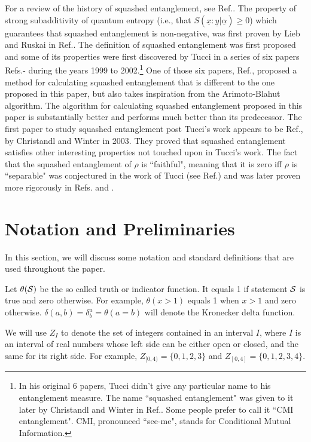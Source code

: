 \documentclass[12pt]{article}%
\newcommand{\ul}[1]{\underline{#1}}
\newcommand{\rvx}[0]{{\ul{x}}}
\newcommand{\rvy}[0]{{\ul{y}}}
\newcommand{\cals}[0]{{\cal S}}
\newcommand{\rvalp}[0]{{\ul{\alpha}}}
\begin{document}
For a review of the history of squashed
entanglement, see Ref.\cite{sq-wiki}.
The property
of strong subadditivity
of quantum entropy (i.e., that
$S(\rvx:\rvy|\rvalp)\geq 0$)
which guarantees that
squashed entanglement is non-negative, was first proven by Lieb and Ruskai in Ref.\cite{subadd-proof}.
The definition of squashed entanglement was first
proposed
and some of its properties
were first discovered by Tucci in a series of six papers
Refs.\cite{Tuc99}-\cite{Tuc02}
during the years 1999 to 2002.\footnote{
In his original 6 papers, Tucci didn't give any particular name to
his entanglement measure. The
name ``squashed  entanglement" was given
to it later by Christandl and Winter in Ref.\cite{Chr03}.
Some people prefer to call it ``CMI entanglement". CMI,
pronounced ``see-me", stands for Conditional Mutual Information.}
One of those six papers, Ref.\cite{Tuc01a},
proposed a method
for calculating squashed
entanglement that is different to the one
proposed in this paper, but also takes inspiration
from the Arimoto-Blahut algorithm.
The algorithm for calculating squashed
entanglement proposed in this paper
is substantially better and performs much better than its
predecessor.
The first paper to study
squashed entanglement
post Tucci's work appears to be
Ref.\cite{Chr03}, by Christandl and Winter in 2003.
They proved that squashed entanglement
satisfies other interesting properties
not touched upon in Tucci's work.
The fact that the squashed entanglement
of $\rho$ is
``faithful", meaning that it
is zero iff $\rho$ is ``separable"
was conjectured in the work of Tucci
(see  Ref.\cite{Tuc00a}) and was later proven
more rigorously in Refs.\cite{sep-proof1} and \cite{sep-proof2}.



\section{Notation and Preliminaries}
In this section, we will discuss some notation
and standard definitions that are used throughout the paper.

Let $\theta(\cals)$ be the so called truth or indicator
function. It equals 1 if statement $\cals$
is true and zero otherwise.
For example, $\theta(x>1)$ equals 1 when $x>1$
and zero otherwise.
$\delta(a, b)=\delta^a_b=\theta(a=b)$
 will denote the Kronecker
delta function.

We will use $Z_I$ to
denote the set of integers contained in an interval $I$,
where $I$ is an interval of real numbers
whose left side can be either
open or closed, and the same for its
right side. For example, $Z_{[0, 4)} = \{0, 1, 2, 3\}$
and
$Z_{[0, 4]} = \{0, 1, 2, 3, 4\}$.
\end{document}
